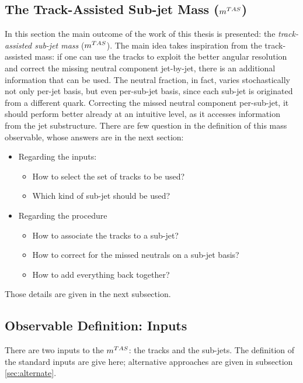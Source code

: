 \subsection{The Track-Assisted Sub-jet Mass ($m^{TAS}$)}
In this section the main outcome of the work of this thesis is presented: the \textit{track-assisted sub-jet mass} ($m^{TAS}$).
The main idea takes inspiration from the track-assisted mass: if one can use the tracks to exploit the better angular resolution and correct the missing neutral component jet-by-jet, there is an additional information that can be used. The neutral fraction, in fact, varies stochastically not only per-jet basis, but even per-sub-jet basis, since each sub-jet is originated from a different quark.
Correcting the missed neutral component per-sub-jet, it should perform better already at an intuitive level, as it accesses information from the jet substructure.
There are few question in the definition of this mass observable, whose answers are in the next section:
\begin{itemize}
  \item Regarding the inputs:
  \begin{itemize}
     \item How to select the set of tracks to be used?
     \item Which kind of sub-jet should be used?
  \end{itemize}
  \item Regarding the procedure
  \begin{itemize}
  
  \item How to associate the tracks to a sub-jet?
  \item How to correct for the missed neutrals on a sub-jet basis?
  \item How to add everything back together?
 \end{itemize} 
 
\end{itemize}

Those details are given in the next subsection.


\subsection{Observable Definition: Inputs}
There are two inputs to the $m^{TAS}$: the tracks and the sub-jets. The definition of the standard inputs are give here; alternative approaches are given in subsection \ref{sec:alternate}.

